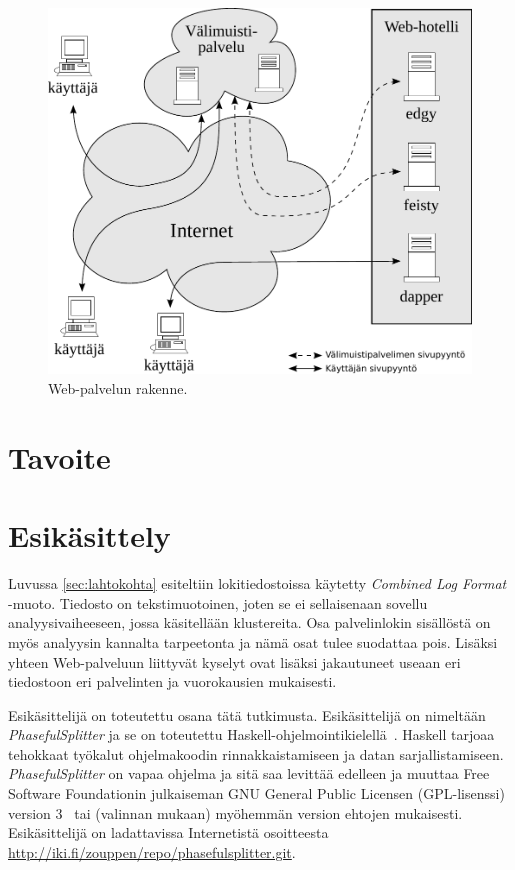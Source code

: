 \begin{figure}[htp]
\centering
\includegraphics[width=12cm]{pics/palvelinrakenne.pdf}
\caption{Web-palvelun rakenne.}
\label{palvelinrakenne}
\end{figure}

\section{Tavoite}



\section{Esikäsittely}


Luvussa \ref{sec:lahtokohta} esiteltiin lokitiedostoissa käytetty
\textit{Combined Log Format} -muoto. Tiedosto on tekstimuotoinen,
joten se ei sellaisenaan sovellu analyysivaiheeseen, jossa käsitellään
klustereita. Osa palvelinlokin sisällöstä on myös analyysin kannalta
tarpeetonta ja nämä osat tulee suodattaa pois. Lisäksi yhteen
Web-palveluun liittyvät kyselyt ovat lisäksi jakautuneet useaan eri
tiedostoon eri palvelinten ja vuorokausien mukaisesti.

Esikäsittelijä on toteutettu osana tätä tutkimusta. Esikäsittelijä on
nimeltään \textit{PhasefulSplitter} ja se on toteutettu
Haskell-ohjelmointikielellä~\cite{haskell98}. Haskell tarjoaa
tehokkaat työkalut ohjelmakoodin rinnakkaistamiseen ja datan
sarjallistamiseen. \textit{PhasefulSplitter} on vapaa ohjelma ja sitä saa
levittää edelleen ja muuttaa Free Software Foundationin julkaiseman
GNU General Public Licensen (GPL-lisenssi) version 3~\cite{gplv3} tai (valinnan
mukaan) myöhemmän version ehtojen mukaisesti. Esikäsittelijä on
ladattavissa Internetistä osoitteesta \\
\url{http://iki.fi/zouppen/repo/phasefulsplitter.git}.

